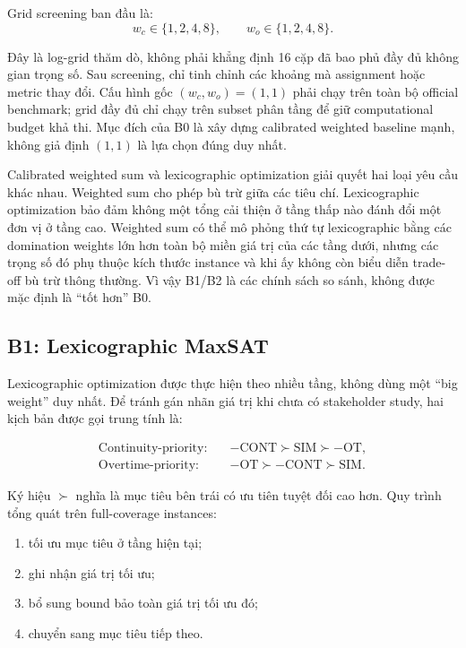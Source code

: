 \documentclass[12pt,a4paper]{article}
\newcommand{\SIM}{\mathrm{SIM}}
\newcommand{\CONT}{\mathrm{CONT}}
\newcommand{\OT}{\mathrm{OT}}
\begin{document}
Grid screening ban đầu là:
\begin{equation}
  w_c\in\{1,2,4,8\},
  \qquad
  w_o\in\{1,2,4,8\}.
\end{equation}

Đây là log-grid thăm dò, không phải khẳng định 16 cặp đã bao phủ đầy đủ không
gian trọng số. Sau screening, chỉ tinh chỉnh các khoảng mà assignment hoặc
metric thay đổi. Cấu hình gốc $(w_c,w_o)=(1,1)$ phải chạy trên toàn bộ official
benchmark; grid đầy đủ chỉ chạy trên subset phân tầng để giữ computational
budget khả thi. Mục đích của B0 là xây dựng calibrated weighted baseline mạnh,
không giả định $(1,1)$ là lựa chọn đúng duy nhất.

Calibrated weighted sum và lexicographic optimization giải quyết hai loại yêu
cầu khác nhau. Weighted sum cho phép bù trừ giữa các tiêu chí. Lexicographic
optimization bảo đảm không một tổng cải thiện ở tầng thấp nào đánh đổi một đơn
vị ở tầng cao. Weighted sum có thể mô phỏng thứ tự lexicographic bằng các
domination weights lớn hơn toàn bộ miền giá trị của các tầng dưới, nhưng các
trọng số đó phụ thuộc kích thước instance và khi ấy không còn biểu diễn trade-off
bù trừ thông thường. Vì vậy B1/B2 là các chính sách so sánh, không được mặc định
là ``tốt hơn'' B0.

\subsection{B1: Lexicographic MaxSAT}

Lexicographic optimization được thực hiện theo nhiều tầng, không dùng một
``big weight'' duy nhất. Để tránh gán nhãn giá trị khi chưa có stakeholder
study, hai kịch bản được gọi trung tính là:

\begin{align}
  \text{Continuity-priority:}\quad
    &-\CONT \succ \SIM \succ -\OT,
    \label{eq:continuity-priority}\\
  \text{Overtime-priority:}\quad
    &-\OT \succ -\CONT \succ \SIM.
    \label{eq:overtime-priority}
\end{align}

Ký hiệu $\succ$ nghĩa là mục tiêu bên trái có ưu tiên tuyệt đối cao hơn. Quy
trình tổng quát trên full-coverage instances:
\begin{enumerate}
  \item tối ưu mục tiêu ở tầng hiện tại;
  \item ghi nhận giá trị tối ưu;
  \item bổ sung bound bảo toàn giá trị tối ưu đó;
  \item chuyển sang mục tiêu tiếp theo.
\end{enumerate}
\end{document}

